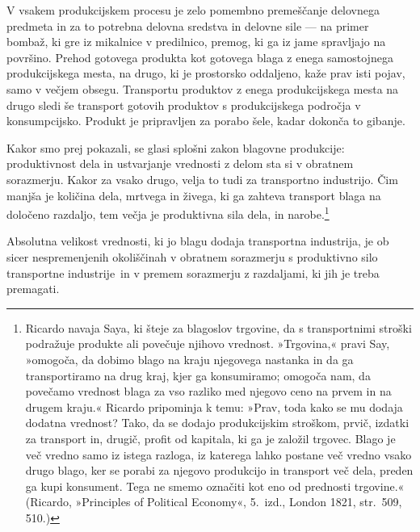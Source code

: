 \documentclass[kapital_02.tex]{subfiles}
\begin{document}
V vsakem produkcijskem procesu je zelo pomembno premeščanje delovnega predmeta in za to potrebna delovna sredstva in delovne sile — na primer bombaž, ki gre iz mikalnice v predilnico, premog, ki ga iz jame spravljajo na površino.
Prehod gotovega produkta kot gotovega blaga z enega samostojnega produkcijskega mesta, na drugo, ki je prostorsko oddaljeno, kaže prav isti pojav, samo v večjem obsegu.
Transportu produktov z enega produkcijskega mesta na drugo sledi še transport gotovih produktov s produkcijskega področja v konsumpcijsko. 
Produkt je pripravljen za porabo šele, kadar dokonča to gibanje.

Kakor smo prej pokazali, se glasi splošni zakon blagovne produkcije: produktivnost dela in ustvarjanje vrednosti z delom sta si v obratnem sorazmerju.
Kakor za vsako drugo, velja to tudi za transportno industrijo.
Čim manjša je količina dela, mrtvega in živega, ki ga zahteva transport blaga na določeno razdaljo, tem večja je produktivna sila dela, in narobe.\footnote
{Ricardo navaja Saya, ki šteje za blagoslov trgovine, da s transportnimi stroški podražuje produkte ali povečuje njihovo vrednost.
»Trgovina,« pravi Say, »omogoča, da dobimo blago na kraju njegovega nastanka in da ga transportiramo na drug kraj, kjer ga konsumiramo; omogoča nam, da povečamo vrednost blaga za vso razliko med njegovo ceno na prvem in na drugem kraju.«
Ricardo pripominja k temu: »Prav, toda kako se mu dodaja dodatna vrednost?
Tako, da se dodajo produkcijskim stroškom, prvič, izdatki za transport in, drugič, profit od kapitala, ki ga je založil trgovec.
Blago je več vredno samo iz istega razloga, iz katerega lahko postane več vredno vsako drugo blago, ker se porabi za njegovo produkcijo in transport več dela, preden ga kupi konsument.
Tega ne smemo označiti kot eno od prednosti trgovine.«
(Ricardo, »Principles of Political Economy«, 5.\ izd., London 1821, str.\ 509, 510.)}

Absolutna velikost vrednosti, ki jo blagu dodaja transportna industrija, je ob sicer nespremenjenih okoliščinah v obratnem sorazmerju s produktivno silo transportne industrije\KPEstran\ in v premem sorazmerju z razdaljami, ki jih je treba premagati.
\end{document}
